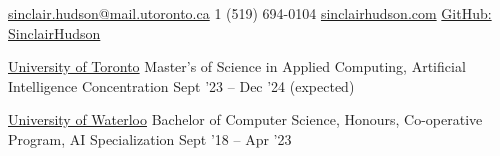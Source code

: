 \documentclass[10pt,a4paper]{article} %
\begin{document}
 



\noindent\href{mailto:sinclair.hudson@mail.utoronto.ca}{sinclair.hudson@mail.utoronto.ca}\bull %
\textsmaller{+}1 (519) 694-0104 \bull %
\href{http://www.sinclairhudson.com}{sinclairhudson.com} \bull
\href{https://github.com/SinclairHudson}{GitHub: SinclairHudson}

\spacedhrule{0.4em}{-0.4em} %

\headedsection %
{\href{https://www.utoronto.ca/}{University of Toronto}}
{\textsc{}} {
\headedsubsection %
{Master's of Science in Applied Computing, Artificial Intelligence Concentration}
{Sept '23 -- Dec '24 (expected)}
{}
}

\headedsection %
{\href{https://uwaterloo.ca/}{University of Waterloo}}
{\textsc{}} {
\headedsubsection %
{Bachelor of Computer Science, Honours, Co-operative Program, AI Specialization}
{Sept '18 -- Apr '23}
{}
}
\spacedhrule{0.4em}{-0.4em} %
\end{document}
